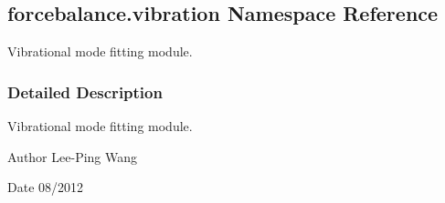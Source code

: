 \hypertarget{namespaceforcebalance_1_1vibration}{}\subsection{forcebalance.\+vibration Namespace Reference}
\label{namespaceforcebalance_1_1vibration}


Vibrational mode fitting module.  




\subsubsection{Detailed Description}
Vibrational mode fitting module. 

\begin{DoxyAuthor}{Author}
Lee-\/\+Ping Wang 
\end{DoxyAuthor}
\begin{DoxyDate}{Date}
08/2012 
\end{DoxyDate}
